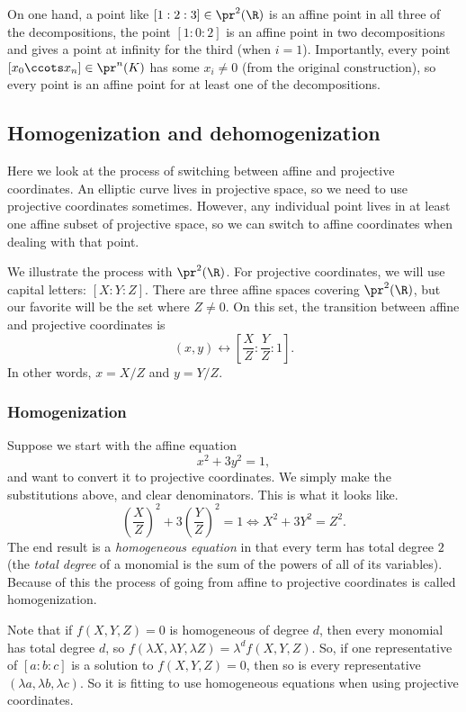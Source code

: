 \documentclass[12pt]{amsart}
\theoremstyle{plain}
\theoremstyle{definition}
\theoremstyle{remark}
\begin{document}
On one hand, a point like $[1:2:3]\in\pr^2(\R)$ is an affine point in all
three of the decompositions, the point $[1:0:2]$ is an affine point in two
decompositions and gives a point at infinity for the third (when $i=1$).
Importantly, every point $[x_0\ccots x_n]\in\pr^n(K)$ has some $x_i\neq 0$
(from the original construction), so every point is an affine point for
at least one of the decompositions.

\subsection{Homogenization and dehomogenization}
Here we look at the process of switching between affine and projective
coordinates.  An elliptic curve lives in projective space, so we need
to use projective coordinates sometimes. However, any individual point
lives in at least one affine subset of projective space, so we can
switch to affine coordinates when dealing with that point.

We illustrate the process with $\pr^2(\R)$.  For projective
coordinates, we will use capital letters: $[X:Y:Z]$.  There are three
affine spaces covering $\pr^2(\R)$, but our favorite will be the set
where $Z\neq 0$.  On this set, the transition between affine and
projective coordinates is
\[ (x,y) \leftrightarrow \left[\frac X Z : \frac Y Z : 1\right].\]
In other words, $x=X/Z$ and $y=Y/Z$.

\subsubsection{Homogenization}

Suppose we start with the affine equation 
\begin{equation}\label{ex1}
x^2+3y^2 = 1,
\end{equation}
and want to convert it to projective coordinates.  We simply make the
substitutions above, and clear denominators.  This is what it looks
like.
\begin{equation} \label{eq1hom}
 \left(\frac X Z\right)^2 + 3\left( \frac Y Z\right)^2 = 1 \iff
X^2+3Y^2=Z^2.
\end{equation}
The end result is a \emph{homogeneous equation} in that every term has
total degree $2$ (the \emph{total degree} of a monomial is the sum of
the powers of all of its variables).  Because of this the process of
going from affine to projective coordinates is called homogenization.

Note that if $f(X,Y,Z)=0$ is homogeneous of degree $d$, then every
monomial has total degree $d$, so $f(\lambda X, \lambda Y, \lambda Z)=
\lambda^d f(X,Y,Z)$.  So, if one representative of $[a:b:c]$ is a
solution to $f(X,Y,Z)=0$, then so is every representative $(\lambda a,
\lambda b, \lambda c)$.  So it is fitting to use homogeneous equations
when using projective coordinates.
\end{document}
